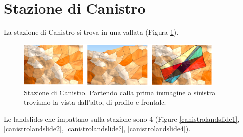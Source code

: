 \newpage 

\section{Stazione di Canistro}
La stazione di Canistro si trova in una vallata (Figura \ref{Canistro_Final}).  

	\begin{figure}[h]
	\centering
	\includegraphics[width=0.9\textwidth]{images/CanistroFinal}
	\caption{Stazione di Canistro. Partendo dalla prima immagine a sinistra  troviamo la vista dall'alto, di profilo e frontale.}
	\label{Canistro_Final}
\end{figure}

Le landslides che impattano sulla stazione sono 4 (Figure \ref{canistrolandslide1}, \ref{canistrolandslide2}, \ref{canistrolandslide3}, \ref{canistrolandslide4}). 

